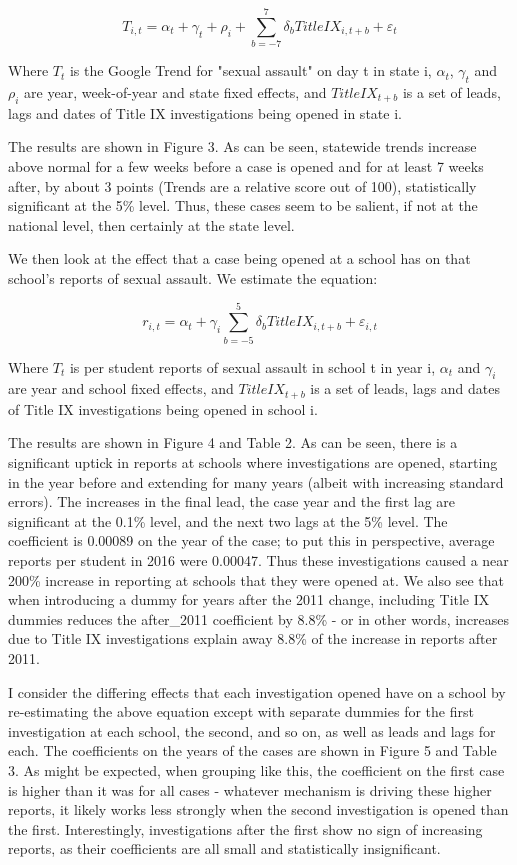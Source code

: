 \documentclass[AER,draftmode]{AEA}
\begin{document}
$$
T_{i,t} = \alpha_{t} + \gamma_{t} + \rho_{i} + \sum_{b=-7}^{7} \delta_{b} TitleIX_{i,t+b} + \varepsilon_{t}
$$

Where $T_{t}$ is the Google Trend for "sexual assault" on day t in state i, $\alpha_{t}$, $\gamma_{t}$ and $\rho_{i}$ are year, week-of-year and state fixed effects, and $TitleIX_{t+b}$ is a set of leads, lags and dates of Title IX investigations being opened in state i. 

The results are shown in Figure 3. As can be seen, statewide trends increase above normal for a few weeks before a case is opened and for at least 7 weeks after, by about 3 points (Trends are a relative score out of 100), statistically significant at the 5\% level. Thus, these cases seem to be salient, if not at the national level, then certainly at the state level.

We then look at the effect that a case being opened at a school has on that school's reports of sexual assault. We estimate the equation:

$$
r_{i,t} = \alpha_{t} + \gamma_{i} \sum_{b=-5}^{5} \delta_{b} TitleIX_{i,t+b} + \varepsilon_{i,t}
$$

Where $T_{t}$ is per student reports of sexual assault in school t in year i, $\alpha_{t}$ and $\gamma_{i}$ are year and school fixed effects, and $TitleIX_{t+b}$ is a set of leads, lags and dates of Title IX investigations being opened in school i. 

The results are shown in Figure 4 and Table 2. As can be seen, there is a significant uptick in reports at schools where investigations are opened, starting in the year before and extending for many years (albeit with increasing standard errors). The increases in the final lead, the case year and the first lag are significant at the 0.1\% level, and the next two lags at the 5\% level. The coefficient is 0.00089 on the year of the case; to put this in perspective, average reports per student in 2016 were 0.00047. Thus these investigations caused a near 200\% increase in reporting at schools that they were opened at. We also see that when introducing a dummy for years after the 2011 change, including Title IX dummies reduces the after\_2011 coefficient by 8.8\% - or in other words, increases due to Title IX investigations explain away 8.8\% of the increase in reports after 2011.

I consider the differing effects that each investigation opened have on a school by re-estimating the above equation except with separate dummies for the first investigation at each school, the second, and so on, as well as leads and lags for each. The coefficients on the years of the cases are shown in Figure 5 and Table 3. As might be expected, when grouping like this, the coefficient on the first case is higher than it was for all cases - whatever mechanism is driving these higher reports, it likely works less strongly when the second investigation is opened than the first. Interestingly, investigations after the first show no sign of increasing reports, as their coefficients are all small and statistically insignificant. 
\end{document}
